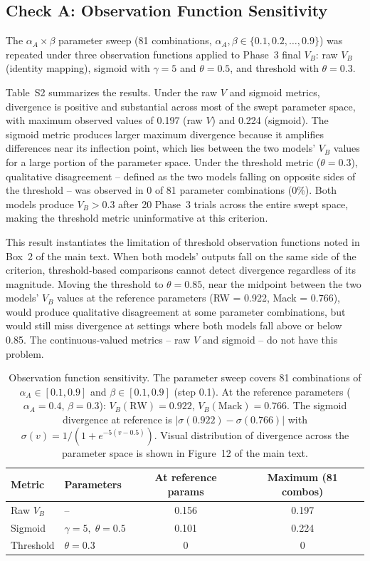 \documentclass[11pt,a4paper]{article}
\begin{document}
\subsection{Check A: Observation Function Sensitivity}
\label{sec:s2a}

The $\alpha_A \times \beta$ parameter sweep (81 combinations, $\alpha_A, \beta \in \{0.1, 0.2, \ldots, 0.9\}$) was repeated under three observation functions applied to Phase~3 final $V_B$: raw $V_B$ (identity mapping), sigmoid with $\gamma = 5$ and $\theta = 0.5$, and threshold with $\theta = 0.3$.

Table~S2 summarizes the results. Under the raw $V$ and sigmoid metrics, divergence is positive and substantial across most of the swept parameter space, with maximum observed values of 0.197 (raw $V$) and 0.224 (sigmoid). The sigmoid metric produces larger maximum divergence because it amplifies differences near its inflection point, which lies between the two models' $V_B$ values for a large portion of the parameter space. Under the threshold metric ($\theta = 0.3$), qualitative disagreement -- defined as the two models falling on opposite sides of the threshold -- was observed in 0 of 81 parameter combinations (0\%). Both models produce $V_B > 0.3$ after 20 Phase~3 trials across the entire swept space, making the threshold metric uninformative at this criterion.

This result instantiates the limitation of threshold observation functions noted in Box~2 of the main text. When both models' outputs fall on the same side of the criterion, threshold-based comparisons cannot detect divergence regardless of its magnitude. Moving the threshold to $\theta = 0.85$, near the midpoint between the two models' $V_B$ values at the reference parameters (RW = 0.922, Mack = 0.766), would produce qualitative disagreement at some parameter combinations, but would still miss divergence at settings where both models fall above or below 0.85. The continuous-valued metrics -- raw $V$ and sigmoid -- do not have this problem.

\begin{table}[htbp]
\centering
\small
\caption{Observation function sensitivity. The parameter sweep covers 81 combinations of $\alpha_A \in [0.1, 0.9]$ and $\beta \in [0.1, 0.9]$ (step 0.1). At the reference parameters ($\alpha_A = 0.4$, $\beta = 0.3$): $V_B(\text{RW}) = 0.922$, $V_B(\text{Mack}) = 0.766$. The sigmoid divergence at reference is $|\sigma(0.922) - \sigma(0.766)|$ with $\sigma(v) = 1/(1 + e^{-5(v-0.5)})$. Visual distribution of divergence across the parameter space is shown in Figure~12 of the main text.}
\label{tab:s2_obs}
\begin{tabular}{llcc}
\toprule
Metric & Parameters & At reference params & Maximum (81 combos) \\
\midrule
Raw $V_B$ & -- & 0.156 & 0.197 \\
Sigmoid & $\gamma = 5,\;\theta = 0.5$ & 0.101 & 0.224 \\
Threshold & $\theta = 0.3$ & 0 & 0 \\
\bottomrule
\end{tabular}
\end{table}
\end{document}

